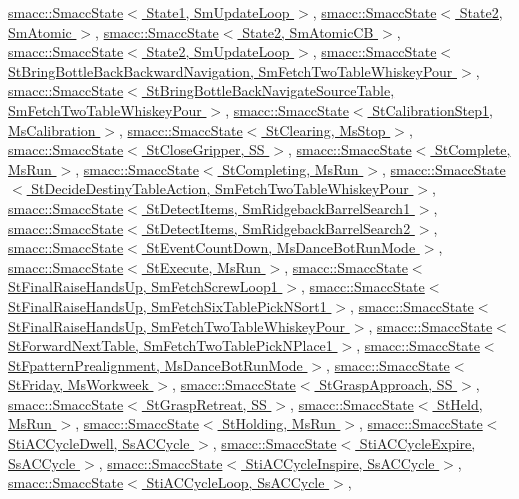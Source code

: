 \hyperlink{classsmacc_1_1SmaccState}{smacc\+::\+Smacc\+State$<$ State1, Sm\+Update\+Loop $>$}, \hyperlink{classsmacc_1_1SmaccState}{smacc\+::\+Smacc\+State$<$ State2, Sm\+Atomic $>$}, \hyperlink{classsmacc_1_1SmaccState}{smacc\+::\+Smacc\+State$<$ State2, Sm\+Atomic\+C\+B $>$}, \hyperlink{classsmacc_1_1SmaccState}{smacc\+::\+Smacc\+State$<$ State2, Sm\+Update\+Loop $>$}, \hyperlink{classsmacc_1_1SmaccState}{smacc\+::\+Smacc\+State$<$ St\+Bring\+Bottle\+Back\+Backward\+Navigation, Sm\+Fetch\+Two\+Table\+Whiskey\+Pour $>$}, \hyperlink{classsmacc_1_1SmaccState}{smacc\+::\+Smacc\+State$<$ St\+Bring\+Bottle\+Back\+Navigate\+Source\+Table, Sm\+Fetch\+Two\+Table\+Whiskey\+Pour $>$}, \hyperlink{classsmacc_1_1SmaccState}{smacc\+::\+Smacc\+State$<$ St\+Calibration\+Step1, Ms\+Calibration $>$}, \hyperlink{classsmacc_1_1SmaccState}{smacc\+::\+Smacc\+State$<$ St\+Clearing, Ms\+Stop $>$}, \hyperlink{classsmacc_1_1SmaccState}{smacc\+::\+Smacc\+State$<$ St\+Close\+Gripper, S\+S $>$}, \hyperlink{classsmacc_1_1SmaccState}{smacc\+::\+Smacc\+State$<$ St\+Complete, Ms\+Run $>$}, \hyperlink{classsmacc_1_1SmaccState}{smacc\+::\+Smacc\+State$<$ St\+Completing, Ms\+Run $>$}, \hyperlink{classsmacc_1_1SmaccState}{smacc\+::\+Smacc\+State$<$ St\+Decide\+Destiny\+Table\+Action, Sm\+Fetch\+Two\+Table\+Whiskey\+Pour $>$}, \hyperlink{classsmacc_1_1SmaccState}{smacc\+::\+Smacc\+State$<$ St\+Detect\+Items, Sm\+Ridgeback\+Barrel\+Search1 $>$}, \hyperlink{classsmacc_1_1SmaccState}{smacc\+::\+Smacc\+State$<$ St\+Detect\+Items, Sm\+Ridgeback\+Barrel\+Search2 $>$}, \hyperlink{classsmacc_1_1SmaccState}{smacc\+::\+Smacc\+State$<$ St\+Event\+Count\+Down, Ms\+Dance\+Bot\+Run\+Mode $>$}, \hyperlink{classsmacc_1_1SmaccState}{smacc\+::\+Smacc\+State$<$ St\+Execute, Ms\+Run $>$}, \hyperlink{classsmacc_1_1SmaccState}{smacc\+::\+Smacc\+State$<$ St\+Final\+Raise\+Hands\+Up, Sm\+Fetch\+Screw\+Loop1 $>$}, \hyperlink{classsmacc_1_1SmaccState}{smacc\+::\+Smacc\+State$<$ St\+Final\+Raise\+Hands\+Up, Sm\+Fetch\+Six\+Table\+Pick\+N\+Sort1 $>$}, \hyperlink{classsmacc_1_1SmaccState}{smacc\+::\+Smacc\+State$<$ St\+Final\+Raise\+Hands\+Up, Sm\+Fetch\+Two\+Table\+Whiskey\+Pour $>$}, \hyperlink{classsmacc_1_1SmaccState}{smacc\+::\+Smacc\+State$<$ St\+Forward\+Next\+Table, Sm\+Fetch\+Two\+Table\+Pick\+N\+Place1 $>$}, \hyperlink{classsmacc_1_1SmaccState}{smacc\+::\+Smacc\+State$<$ St\+Fpattern\+Prealignment, Ms\+Dance\+Bot\+Run\+Mode $>$}, \hyperlink{classsmacc_1_1SmaccState}{smacc\+::\+Smacc\+State$<$ St\+Friday, Ms\+Workweek $>$}, \hyperlink{classsmacc_1_1SmaccState}{smacc\+::\+Smacc\+State$<$ St\+Grasp\+Approach, S\+S $>$}, \hyperlink{classsmacc_1_1SmaccState}{smacc\+::\+Smacc\+State$<$ St\+Grasp\+Retreat, S\+S $>$}, \hyperlink{classsmacc_1_1SmaccState}{smacc\+::\+Smacc\+State$<$ St\+Held, Ms\+Run $>$}, \hyperlink{classsmacc_1_1SmaccState}{smacc\+::\+Smacc\+State$<$ St\+Holding, Ms\+Run $>$}, \hyperlink{classsmacc_1_1SmaccState}{smacc\+::\+Smacc\+State$<$ Sti\+A\+C\+Cycle\+Dwell, Ss\+A\+C\+Cycle $>$}, \hyperlink{classsmacc_1_1SmaccState}{smacc\+::\+Smacc\+State$<$ Sti\+A\+C\+Cycle\+Expire, Ss\+A\+C\+Cycle $>$}, \hyperlink{classsmacc_1_1SmaccState}{smacc\+::\+Smacc\+State$<$ Sti\+A\+C\+Cycle\+Inspire, Ss\+A\+C\+Cycle $>$}, \hyperlink{classsmacc_1_1SmaccState}{smacc\+::\+Smacc\+State$<$ Sti\+A\+C\+Cycle\+Loop, Ss\+A\+C\+Cycle $>$}, 